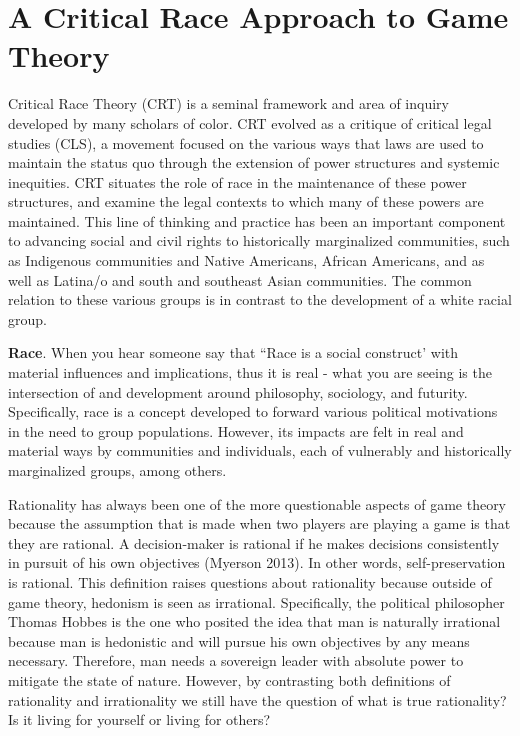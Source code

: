 \documentclass[12pt,twoside]{article}
\begin{document}
\section{A Critical Race Approach to Game Theory}

Critical Race Theory (CRT) is a seminal framework and area of inquiry developed by many scholars of color. CRT evolved as a critique of critical legal studies (CLS), a movement focused on the various ways that laws are used to maintain the status quo through the extension of power structures and systemic inequities. CRT situates the role of race in the maintenance of these power structures, and examine the legal contexts to which many of these powers are maintained. This line of thinking and practice has been an important component to advancing social and civil rights to historically marginalized communities, such as Indigenous communities and Native Americans, African Americans, and as well as Latina/o and south and southeast Asian communities. The common relation to these various groups is in contrast to the development of a white racial group.

\textbf{Race}. When you hear someone say that ``Race is a social construct' with material influences and implications, thus it is real - what you are seeing is the intersection of and development around philosophy, sociology, and futurity. Specifically, race is a concept developed to forward various political motivations in the need to group populations. However, its impacts are felt in real and material ways by communities and individuals, each of vulnerably and historically marginalized groups, among others.


Rationality has always been one of the more questionable aspects of game theory because the assumption that is made when two players are playing a game is that they are rational. A decision-maker is rational if he makes decisions consistently in pursuit of his own objectives (Myerson 2013). In other words, self-preservation is rational. This definition raises questions about rationality because outside of game theory, hedonism is seen as irrational. Specifically, the political philosopher Thomas Hobbes is the one who posited the idea that man is naturally irrational because man is hedonistic and will pursue his own objectives by any means necessary. Therefore, man needs a sovereign leader with absolute power to mitigate the state of nature. However, by contrasting both definitions of rationality and irrationality we still have the question of what is true rationality? Is it living for yourself or living for others?
\end{document}
